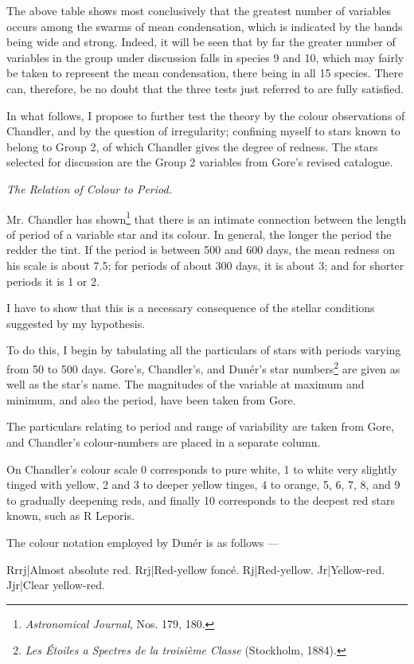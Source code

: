 \documentclass[a4paper, 12pt, oneside, polutonikogreek, english]{article}
\begin{document}
The above table shows most conclusively that the greatest number of variables occurs among the swarms of mean condensation, which is indicated by the bands being wide and strong. Indeed, it will be seen that by far the greater number of variables in the group under discussion falls in species 9 and 10, which may fairly be taken to represent the mean condensation, there being in all 15 species. There can, therefore, be no doubt that the three tests just referred to are fully satisfied.

In what follows, I propose to further test the theory by the colour observations of Chandler, and by the question of irregularity; confining myself to stars known to belong to Group 2, of which Chandler gives the degree of redness. The stars selected for discussion are the Group 2 variables from Gore's revised catalogue.

\emph{The Relation of Colour to Period.}

Mr. Chandler has shown\footnote{\emph{Astronomical Journal}, Nos. 179, 180.} that there is an intimate connection between the length of period of a variable star and its colour. In general, the longer the period the redder the tint. If the period is between 500 and 600 days, the mean redness on his scale is about 7.5; for periods of about 300 days, it is about 3; and for shorter periods it is 1 or 2.

I have to show that this is a necessary consequence of the stellar conditions suggested by my hypothesis.

To do this, I begin by tabulating all the particulars of stars with periods varying from 50 to 500 days. Gore's, Chandler's, and Dunér's star numbers\footnote{\emph{Les Étoiles a Spectres de la troisième Classe} (Stockholm, 1884).} are given as well as the star's name. The magnitudes of the variable at maximum and minimum, and also the period, have been taken from Gore.

The particulars relating to period and range of variability are taken from Gore, and Chandler's colour-numbers are placed in a separate column.

On Chandler's colour scale 0 corresponds to pure white, 1 to white very slightly tinged with yellow, 2 and 3 to deeper yellow tinges, 4 to orange, 5, 6, 7, 8, and 9 to gradually deepening reds, and finally 10 corresponds to the deepest red stars known, such as R Leporis.

The colour notation employed by Dunér is as follows ---

Rrrj|Almost absolute red. Rrj|Red-yellow foncé. Rj|Red-yellow. Jr|Yellow-red. Jjr|Clear yellow-red.
\end{document}
